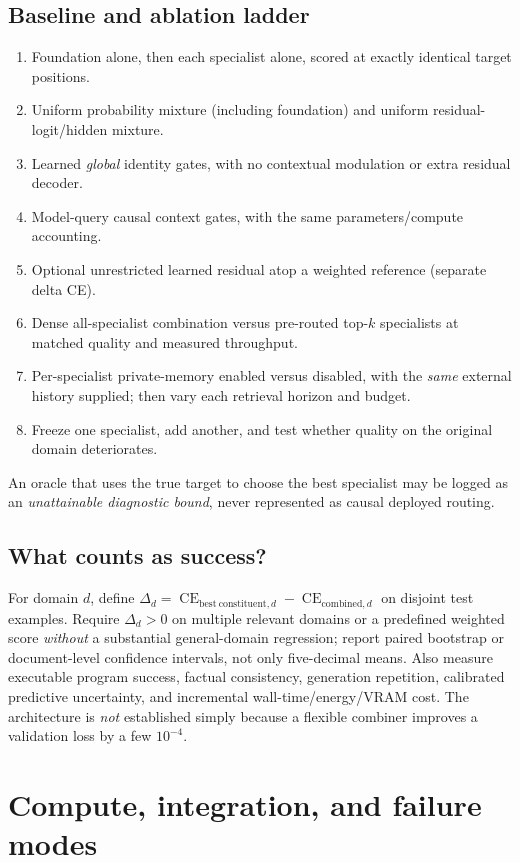 \documentclass[11pt,letterpaper]{article}
\newcommand{\CE}{\operatorname{CE}}
\begin{document}
\subsection{Baseline and ablation ladder}
\begin{enumerate}
\item Foundation alone, then each specialist alone, scored at exactly identical target positions.
\item Uniform probability mixture (including foundation) and uniform residual-logit/hidden mixture.
\item Learned \emph{global} identity gates, with no contextual modulation or extra residual decoder.
\item Model-query causal context gates, with the same parameters/compute accounting.
\item Optional unrestricted learned residual atop a weighted reference (separate delta CE).
\item Dense all-specialist combination versus pre-routed top-$k$ specialists at matched quality and measured throughput.
\item Per-specialist private-memory enabled versus disabled, with the \emph{same} external history supplied; then vary each retrieval horizon and budget.
\item Freeze one specialist, add another, and test whether quality on the original domain deteriorates.
\end{enumerate}
An oracle that uses the true target to choose the best specialist may be logged as an \emph{unattainable diagnostic bound}, never represented as causal deployed routing.

\subsection{What counts as success?}
For domain $d$, define $\Delta_d=\CE_{\mathrm{best\ constituent},d}-\CE_{\mathrm{combined},d}$ on disjoint test examples. Require $\Delta_d>0$ on multiple relevant domains or a predefined weighted score \emph{without} a substantial general-domain regression; report paired bootstrap or document-level confidence intervals, not only five-decimal means. Also measure executable program success, factual consistency, generation repetition, calibrated predictive uncertainty, and incremental wall-time/energy/VRAM cost. The architecture is \emph{not} established simply because a flexible combiner improves a validation loss by a few $10^{-4}$.

\section{Compute, integration, and failure modes}
\label{sec:compute}
\end{document}
